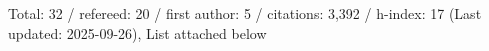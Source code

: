 Total: 32 / refereed: 20 / first author: 5 / citations: 3,392 / h-index: 17 (Last updated: 2025-09-26), List attached below